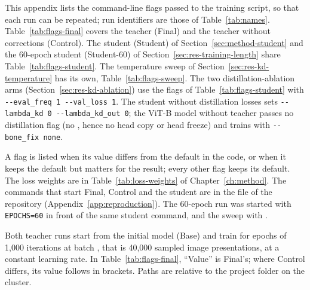 This appendix lists the command-line flags passed to the training script, so that each run can be repeated; run
identifiers are those of Table~\ref{tab:names}. Table~\ref{tab:flags-final} covers the teacher (Final) and the
teacher without corrections (Control). The student (Student) of Section~\ref{sec:method-student} and the 60-epoch
student (Student-60) of Section~\ref{sec:res-training-length} share Table~\ref{tab:flags-student}. The temperature
sweep of Section~\ref{sec:res-kd-temperature} has its own, Table~\ref{tab:flags-sweep}. The two
distillation-ablation arms (Section~\ref{sec:res-kd-ablation}) use the flags of
Table~\ref{tab:flags-student} with \texttt{-{}-eval\_freq 1 -{}-val\_loss 1}. The student without distillation losses sets
\texttt{-{}-lambda\_kd 0 -{}-lambda\_kd\_out 0}; the ViT-B model without teacher passes no distillation flag (no
, hence no head copy or head freeze) and trains with \texttt{-{}-bone\_fix none}.

A flag is listed when its value differs from the default in the code, or when it keeps the default but matters for
the result; every other flag keeps its default. The loss weights are in Table~\ref{tab:loss-weights} of
Chapter~\ref{ch:method}. The commands that start Final, Control and the student are in the file
 of the repository (Appendix~\ref{app:reproduction}). The 60-epoch run was started
with \texttt{EPOCHS=60} in front of the same student command, and the sweep with
.

Both teacher runs start from the initial model (Base) and train for \MethodFinalEpochs{} epochs of 1,000 iterations
at batch \MethodFinalBatch, that is 40,000 sampled image presentations, at a constant learning rate. In
Table~\ref{tab:flags-final}, ``Value'' is Final's; where Control differs, its value follows in brackets. Paths are
relative to the project folder on the cluster.

